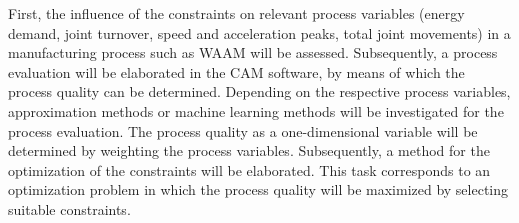 First, the influence of the constraints on relevant process variables (energy demand, joint turnover, speed and acceleration peaks, total joint movements) in a manufacturing process such as WAAM will be assessed. Subsequently, a process evaluation will be elaborated in the CAM software, by means of which the process quality can be determined. Depending on the respective process variables, approximation methods or machine learning methods will be investigated for the process evaluation. The process quality as a one-dimensional variable will be determined by weighting the process variables. Subsequently, a method for the optimization of the constraints will be elaborated. This task corresponds to an optimization problem in which the process quality will be maximized by selecting suitable constraints. 
